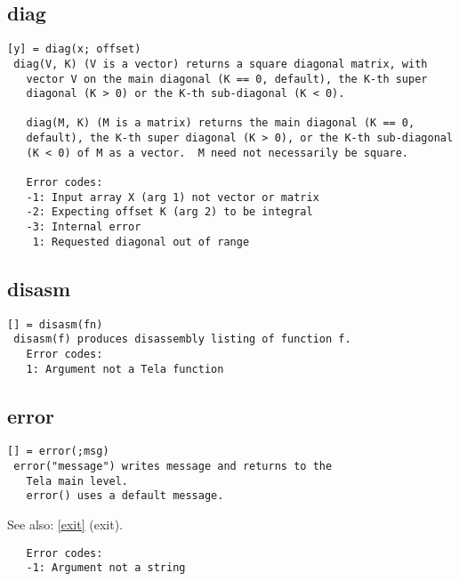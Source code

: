 \documentclass[a4paper]{article}
\begin{document}
\subsection{diag\label{diag}}

\begin{tscreen}
\begin{verbatim}
[y] = diag(x; offset)
 diag(V, K) (V is a vector) returns a square diagonal matrix, with
   vector V on the main diagonal (K == 0, default), the K-th super
   diagonal (K > 0) or the K-th sub-diagonal (K < 0).

   diag(M, K) (M is a matrix) returns the main diagonal (K == 0,
   default), the K-th super diagonal (K > 0), or the K-th sub-diagonal
   (K < 0) of M as a vector.  M need not necessarily be square.

   Error codes:
   -1: Input array X (arg 1) not vector or matrix
   -2: Expecting offset K (arg 2) to be integral
   -3: Internal error
    1: Requested diagonal out of range
\end{verbatim}
\end{tscreen}



\subsection{disasm\label{disasm}}

\begin{tscreen}
\begin{verbatim}
[] = disasm(fn)
 disasm(f) produces disassembly listing of function f.
   Error codes:
   1: Argument not a Tela function 
\end{verbatim}
\end{tscreen}



\subsection{error\label{error}}

\begin{tscreen}
\begin{verbatim}
[] = error(;msg)
 error("message") writes message and returns to the
   Tela main level.
   error() uses a default message.
\end{verbatim}

See also: \ref{exit} {(exit)}.
\begin{verbatim}
   Error codes:
   -1: Argument not a string
\end{verbatim}
\end{tscreen}
\end{document}
